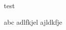 \documentclass[a4j,11pt]{jsarticle}
\begin{document}
test

\begin{FILE}{abc}{}
adlfkjel
ajldkfje
\end{FILE}
\end{document}
